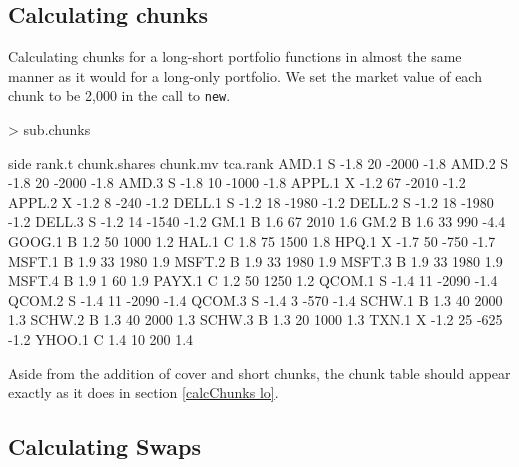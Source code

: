 \documentclass{article}
\begin{document}
\subsection{Calculating chunks}

Calculating chunks for a long-short portfolio functions in almost the
same manner as it would for a long-only portfolio.  We set the market
value of each chunk to be 2,000
in the call to \texttt{new}.


\begin{Schunk}
\begin{Sinput}
> sub.chunks
\end{Sinput}
\begin{Soutput}
       side rank.t chunk.shares chunk.mv tca.rank
AMD.1     S   -1.8           20    -2000     -1.8
AMD.2     S   -1.8           20    -2000     -1.8
AMD.3     S   -1.8           10    -1000     -1.8
APPL.1    X   -1.2           67    -2010     -1.2
APPL.2    X   -1.2            8     -240     -1.2
DELL.1    S   -1.2           18    -1980     -1.2
DELL.2    S   -1.2           18    -1980     -1.2
DELL.3    S   -1.2           14    -1540     -1.2
GM.1      B    1.6           67     2010      1.6
GM.2      B    1.6           33      990     -4.4
GOOG.1    B    1.2           50     1000      1.2
HAL.1     C    1.8           75     1500      1.8
HPQ.1     X   -1.7           50     -750     -1.7
MSFT.1    B    1.9           33     1980      1.9
MSFT.2    B    1.9           33     1980      1.9
MSFT.3    B    1.9           33     1980      1.9
MSFT.4    B    1.9            1       60      1.9
PAYX.1    C    1.2           50     1250      1.2
QCOM.1    S   -1.4           11    -2090     -1.4
QCOM.2    S   -1.4           11    -2090     -1.4
QCOM.3    S   -1.4            3     -570     -1.4
SCHW.1    B    1.3           40     2000      1.3
SCHW.2    B    1.3           40     2000      1.3
SCHW.3    B    1.3           20     1000      1.3
TXN.1     X   -1.2           25     -625     -1.2
YHOO.1    C    1.4           10      200      1.4
\end{Soutput}
\end{Schunk}

Aside from the addition of cover and short chunks, the chunk table
should appear exactly as it does in section \ref{calcChunks lo}.


\subsection{Calculating Swaps}
\end{document}

